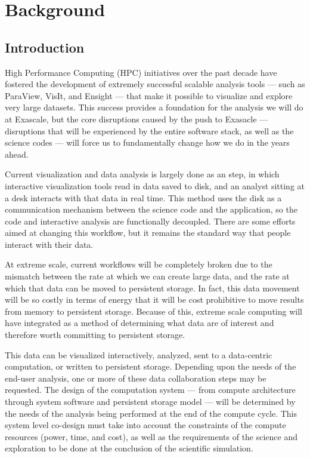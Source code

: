 \section{Background}
\label{sec:Background}

\subsection{Introduction}

High Performance Computing (HPC) initiatives over the past decade have 
fostered the development of extremely successful scalable analysis tools ---
such as ParaView, VisIt, and Ensight --- that make it possible to visualize 
and explore very large datasets.  This success provides a foundation for 
the analysis we will do at Exascale, but the core disruptions caused by
the push to Exasacle --- disruptions that will be experienced by the entire
software stack, as well as the science codes --- will force us to fundamentally
change how we do \vda in the years ahead.

Current visualization and data analysis is largely done as an
 step, in which interactive visualization
tools read in data saved to disk, and an analyst sitting at a desk
interacts with that data in real time.  This method uses the disk as a
communication mechanism between the science code and the \vda application,
so the code and interactive analysis are functionally decoupled.  There are
some efforts aimed at changing this workflow, but it remains the standard
way that people interact with their data.

At extreme scale, current workflows will be completely broken due to 
the mismatch
between the rate at which we can create large data, and the rate at
which that data can be moved to persistent storage.  In fact, this
data movement will be so costly in terms of energy that it will be
cost prohibitive to move results from memory to persistent storage.
Because of this, extreme scale computing will have integrated \vda as a
method of determining what data are of interest and therefore worth
committing to persistent storage.

This data can be visualized interactively, analyzed,
sent to a data-centric computation, or written to persistent
storage.  Depending upon the needs of the end-user analysis, one or
more of these data collaboration steps may be requested.  The design
of the computation system --- from compute architecture through system
software and persistent storage model --- will be determined by the
needs of the analysis being performed at the end of the compute
cycle.  This system level co-design must take into account the
constraints of the compute resources (power, time, and cost), as
well as the requirements of the science and exploration to be done
at the conclusion of the scientific simulation.

